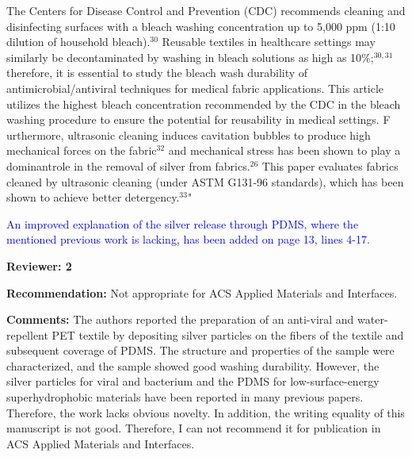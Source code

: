 \documentclass[12pt]{letter}
\newcommand{\blue}[1]{\textcolor{blue}{#1}} %
\begin{document}
{The Centers for Disease Control and Prevention (CDC) recommends cleaning and disinfecting surfaces with a bleach washing concentration up to 5,000 ppm (1:10 dilution of household bleach).$^{30}$ 
Reusable textiles in healthcare settings may similarly be decontaminated by washing in bleach solutions as high as 10\%;$^{30,31}$ therefore, it is essential to study the bleach wash durability of antimicrobial/antiviral techniques for medical fabric applications.  
This article utilizes the highest bleach concentration recommended by the CDC in the bleach washing procedure to ensure the potential for reusability in medical settings.  F
urthermore, ultrasonic cleaning induces cavitation bubbles to produce high mechanical forces on the fabric$^{32}$ and mechanical stress has been shown to play a dominantrole in the removal of silver from fabrics.$^{26}$ 
This paper evaluates fabrics cleaned by ultrasonic cleaning (under ASTM G131-96 standards), which has been shown to achieve better 
detergency.$^{33}$"
}

\blue{An improved explanation of the silver release through PDMS, where the mentioned previous work is lacking, has been added on page 13, lines 4-17. }






\newpage
\textbf{Reviewer: 2}

\textbf{Recommendation:} Not appropriate for ACS Applied Materials and Interfaces.

\textbf{Comments:} The authors reported the preparation of an anti-viral and water-repellent PET textile by depositing silver particles on the fibers of the textile and subsequent coverage of PDMS. The structure and properties of the sample were characterized, and the sample showed good washing durability. However, the silver particles for viral and bacterium and the PDMS for low-surface-energy superhydrophobic materials have been reported in many previous papers. Therefore, the work lacks obvious novelty. In addition, the writing equality of this manuscript is not good. Therefore, I can not recommend it for publication in ACS Applied Materials and Interfaces.
\end{document}
